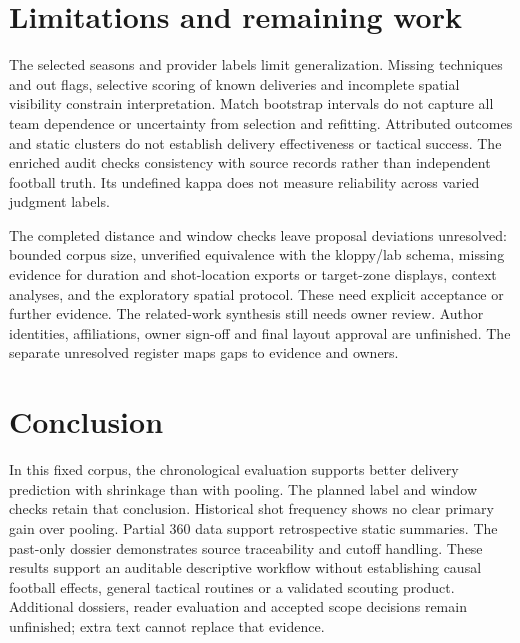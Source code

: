 \documentclass[sigconf,nonacm]{acmart}
\begin{document}
\section{Limitations and remaining work}
The selected seasons and provider labels limit generalization. Missing techniques
and out flags, selective scoring of known deliveries and incomplete spatial
visibility constrain interpretation. Match bootstrap intervals do not capture
all team dependence or uncertainty from selection and refitting. Attributed
outcomes and static clusters do not establish delivery effectiveness or tactical
success. The enriched audit checks consistency with source records rather than
independent football truth. Its undefined kappa does not measure reliability
across varied judgment labels.

The completed distance and window checks leave proposal deviations unresolved:
bounded corpus size, unverified equivalence with the kloppy/lab schema, missing
evidence for duration and shot-location exports or target-zone displays, context
analyses, and the exploratory spatial protocol. These need explicit acceptance
or further evidence. The related-work synthesis still needs owner review.
Author identities, affiliations, owner sign-off and final layout approval are
unfinished. The separate unresolved register maps gaps to evidence and owners.

\section{Conclusion}
In this fixed corpus, the chronological evaluation supports better delivery
prediction with shrinkage than with pooling. The planned label and window checks
retain that conclusion. Historical shot frequency shows no clear primary gain
over pooling. Partial 360 data support retrospective static summaries. The
past-only dossier demonstrates source traceability and cutoff handling. These
results support an auditable descriptive workflow without establishing causal
football effects, general tactical routines or a validated scouting product.
Additional dossiers, reader evaluation and accepted scope decisions remain
unfinished; extra text cannot replace that evidence.

\FloatBarrier

\balance

\end{document}
